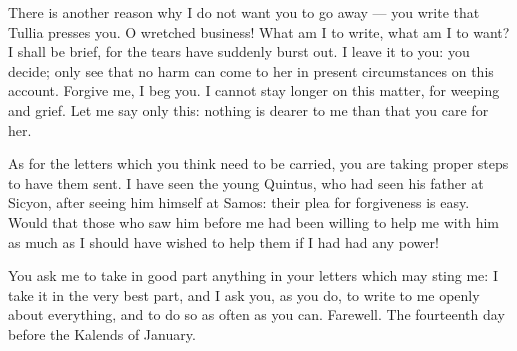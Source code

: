  There is another reason why I do not want you to go away --- you write that Tullia presses you. O wretched business! What am I to write, what am I to want? I shall be brief, for the tears have suddenly burst out. I leave it to you: you decide; only see that no harm can come to her in present circumstances on this account. Forgive me, I beg you. I cannot stay longer on this matter, for weeping and grief. Let me say only this: nothing is dearer to me than that you care for her.

 As for the letters which you think need to be carried, you are taking proper steps to have them sent. I have seen the young Quintus, who had seen his father at Sicyon, after seeing him himself at Samos: their plea for forgiveness is easy. Would that those who saw him before me had been willing to help me with him as much as I should have wished to help them if I had had any power!

 You ask me to take in good part anything in your letters which may sting me: I take it in the very best part, and I ask you, as you do, to write to me openly about everything, and to do so as often as you can. Farewell. The fourteenth day before the Kalends of January.
